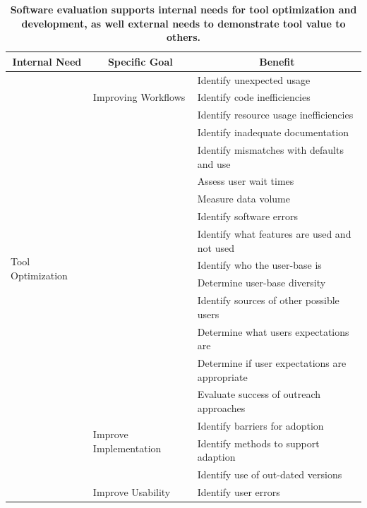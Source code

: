 \documentclass{article}
\begin{document}
\begin{table}[!ht]
 \caption{\textbf{Software evaluation supports internal needs for tool optimization and development, as well external needs to demonstrate tool value 
 to others.} }
  \centering
  \begin{tabular} {|p{}|p{}|p{}|}
    \hline
    \multicolumn{1}{|c|}{\cellcolor[gray]{.9} \textbf{Internal Need}} 
    & \multicolumn{1}{|c|}{\cellcolor[gray]{.9} \textbf{Specific Goal}}
    & \multicolumn{1}{|c|}{\cellcolor[gray]{.9} \textbf{Benefit}}\\[1.1ex]
    \hline
    \multirow{17}{*}{Tool Optimization}               
    & \multirow{3}{*}{Improving Workflows} & 
    Identify unexpected usage \\
    & &
    Identify code inefficiencies \\
    & &
    Identify resource usage inefficiencies \\
    &&
    Identify inadequate documentation\\ \cline{2-3}
    &   \multirow{4}{*}{  }
    & 
     Identify mismatches with defaults and use \\
     &  Improve Performance  &
    Assess user wait times \\
    &  & 
     Measure data volume \\  \cline{2-3}
    & \multirow{5}{*}{ Improve Usage} & 
    Identify software errors \\
    &&
    Identify what features are used and not used \\
    &&
    Identify who the user-base is \\
    & &
    Determine user-base diversity \\
    & &
    Identify sources of other possible users \\
    & &
    Determine what users expectations are \\
    & &
    Determine if user expectations are appropriate \\
    & &
    Evaluate success of outreach approaches\\  \cline{2-3}
    & \multirow{2}{*}{ Improve Implementation} & 
    Identify barriers for adoption \\
    &   &
    Identify methods to support adaption \\
    &  & 
    Identify use of out-dated versions\\\cline{2-3}
    & \multirow{2}{*}{ Improve Usability} & 
    Identify user errors \\

\end{tabular}
\end{table}
\end{document}
